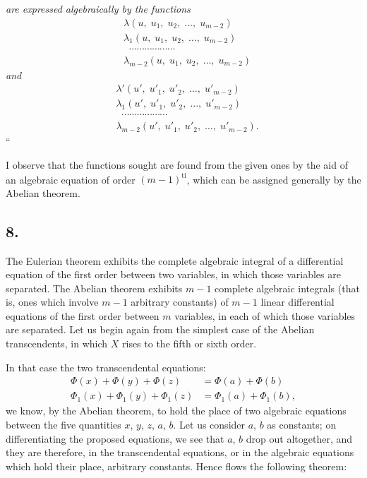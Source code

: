 \documentclass{article}
\begin{document}
\emph{are expressed algebraically by the functions}
\[ \begin{aligned} &\lambda(u, \; u_1, \; u_2, \; \ldots, \; u_{m-2}) \\ &\lambda_1(u, \; u_1, \; u_2, \; \ldots, \; u_{m-2}) \\ &\;\; \cdots\cdots\cdots\cdots\cdots\cdots \\ &\lambda_{m-2}(u, \; u_1, \; u_2, \; \ldots, \; u_{m-2}) \end{aligned} \]
\emph{and}
\[ \begin{aligned} &\lambda'(u', \; u'_1, \; u'_2, \; \ldots, \; u'_{m-2}) \\ &\lambda_1(u', \; u'_1, \; u'_2, \; \ldots, \; u'_{m-2}) \\ &\;\; \cdots\cdots\cdots\cdots\cdots\cdots \\ &\lambda_{m-2}(u', \; u'_1, \; u'_2, \; \ldots, \; u'_{m-2}). \end{aligned} \]“

I observe that the functions sought are found from the given ones by the aid of an algebraic equation of order $(m-1)^{\text{ti}}$, which can be assigned generally by the Abelian theorem.

\subsection*{8.}

The Eulerian theorem exhibits the complete algebraic integral of a differential equation of the first order between two variables, in which those
variables are separated. The Abelian theorem exhibits $m-1$ complete algebraic integrals (that is, ones which involve $m-1$ arbitrary constants) of $m-1$ linear differential equations of the first order between $m$ variables, in each of which those variables are separated. Let us begin again from the simplest case of the Abelian transcendents, in which $X$ rises to the fifth or sixth order.

In that case the two transcendental equations:
\[ \begin{aligned} \Phi(x) + \Phi(y) + \Phi(z) &= \Phi(a) + \Phi(b) \\ \Phi_1(x) + \Phi_1(y) + \Phi_1(z) &= \Phi_1(a) + \Phi_1(b), \end{aligned} \]
we know, by the Abelian theorem, to hold the place of two algebraic equations between the five quantities $x$, $y$, $z$, $a$, $b$. Let us consider $a$, $b$ as constants; on differentiating the proposed equations, we see that $a$, $b$ drop out altogether, and they are therefore, in the transcendental equations, or in the algebraic equations which hold their place, arbitrary constants. Hence flows the following theorem:
\end{document}
